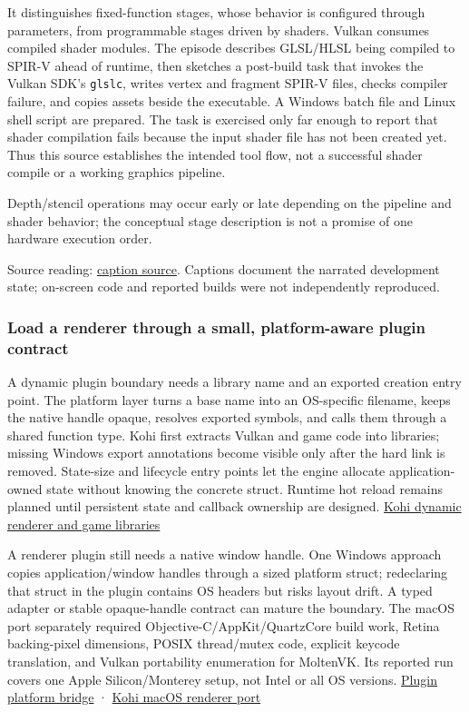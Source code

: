 It distinguishes fixed-function stages, whose behavior is configured through parameters, from programmable stages driven by shaders. Vulkan consumes compiled shader modules. The episode describes GLSL/HLSL being compiled to SPIR-V ahead of runtime, then sketches a post-build task that invokes the Vulkan SDK's \texttt{glslc}, writes vertex and fragment SPIR-V files, checks compiler failure, and copies assets beside the executable. A Windows batch file and Linux shell script are prepared. The task is exercised only far enough to report that shader compilation fails because the input shader file has not been created yet. Thus this source establishes the intended tool flow, not a successful shader compile or a working graphics pipeline.

Depth/stencil operations may occur early or late depending on the pipeline and shader behavior; the conceptual stage description is not a promise of one hardware execution order.

Source reading: \href{https://www.youtube.com/watch?v=KanKG-vd9GA}{caption source}. Captions document the narrated development state; on-screen code and reported builds were not independently reproduced.

\subsubsection{Load a renderer through a small, platform-aware plugin contract}\label{06-engine-ii-ch025-load-a-renderer-through-a-small-platform-aware-plugin-contract}

A dynamic plugin boundary needs a library name and an exported creation entry point. The platform layer turns a base name into an OS-specific filename, keeps the native handle opaque, resolves exported symbols, and calls them through a shared function type. Kohi first extracts Vulkan and game code into libraries; missing Windows export annotations become visible only after the hard link is removed. State-size and lifecycle entry points let the engine allocate application-owned state without knowing the concrete struct. Runtime hot reload remains planned until persistent state and callback ownership are designed. \href{https://www.youtube.com/watch?v=oigQGZJ1Yc0}{Kohi dynamic renderer and game libraries}

A renderer plugin still needs a native window handle. One Windows approach copies application/window handles through a sized platform struct; redeclaring that struct in the plugin contains OS headers but risks layout drift. A typed adapter or stable opaque-handle contract can mature the boundary. The macOS port separately required Objective-C/AppKit/QuartzCore build work, Retina backing-pixel dimensions, POSIX thread/mutex code, explicit keycode translation, and Vulkan portability enumeration for MoltenVK. Its reported run covers one Apple Silicon/Monterey setup, not Intel or all OS versions. \href{https://www.youtube.com/watch?v=gLP3WWSvICs}{Plugin platform bridge} · \href{https://www.youtube.com/watch?v=g9tvP4qf5sA}{Kohi macOS renderer port}

